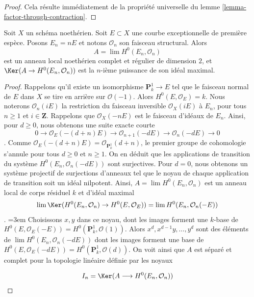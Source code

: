 \begin{proof} Cela résulte immédiatement de la propriété universelle du lemme \ref{lemma-factor-through-contraction}. \end{proof}

\begin{lemma} \label{lemma-exceptional-first-kind-local} Soit $X$ un schéma noethérien. Soit $E \subset X$ une courbe exceptionnelle de première espèce. Posons $E_n = nE$ et notons $\mathcal{O}_n$ son faisceau structural. Alors $$
A = \lim H^0(E_n, \mathcal{O}_n)
$$ est un anneau local noethérien complet et régulier de dimension $2$, et $\Ker(A \to H^0(E_n, \mathcal{O}_n))$ est la $n$-ième puissance de son idéal maximal. \end{lemma}

\begin{proof} Rappelons qu'il existe un isomorphisme $\mathbf{P}^1_k \to E$ tel que le faisceau normal de $E$ dans $X$ se tire en arrière sur $\mathcal{O}(-1)$. Alors $H^0(E, \mathcal{O}_E) = k$. Nous noterons $\mathcal{O}_n(iE)$ la restriction du faisceau inversible $\mathcal{O}_X(iE)$ à $E_n$, pour tous $n \geq 1$ et $i \in \mathbf{Z}$. Rappelons que $\mathcal{O}_X(-nE)$ est le faisceau d'idéaux de $E_n$. Ainsi, pour $d \geq 0$, nous obtenons une suite exacte courte $$
0 \to \mathcal{O}_E(-(d + n)E) \to
\mathcal{O}_{n + 1}(-dE) \to
\mathcal{O}_n(-dE) \to 0
$$. Comme $\mathcal{O}_E(-(d + n)E) = \mathcal{O}_{\mathbf{P}^1_k}(d + n)$, le premier groupe de cohomologie s'annule pour tous $d \geq 0$ et $n \geq 1$. On en déduit que les applications de transition du système $H^0(E_n, \mathcal{O}_n(-dE))$ sont surjectives. Pour $d = 0$, nous obtenons un système projectif de surjections d'anneaux tel que le noyau de chaque application de transition soit un idéal nilpotent. Ainsi, $A = \lim H^0(E_n, \mathcal{O}_n)$ est un anneau local de corps résiduel $k$ et d'idéal maximal $$
\lim \Ker(H^0(E_n, \mathcal{O}_n) \to H^0(E, \mathcal{O}_E)) =
\lim H^0(E_n, \mathcal{O}_n(-E))
$$.
\begingroup\emergencystretch=3em
Choisissons $x, y$ dans ce noyau, dont les images forment une $k$-base de $H^0(E, \mathcal{O}_E(-E)) = H^0(\mathbf{P}^1_k, \mathcal{O}(1))$. Alors $x^d, x^{d - 1}y, \ldots, y^d$ sont des éléments de $\lim H^0(E_n, \mathcal{O}_n(-dE))$ dont les images forment une base de $H^0(E, \mathcal{O}_E(-dE)) = H^0(\mathbf{P}^1_k, \mathcal{O}(d))$. On voit ainsi que $A$ est séparé et complet pour la topologie linéaire définie par les noyaux\par\endgroup
$$
I_n = \Ker(A \longrightarrow H^0(E_n, \mathcal{O}_n))
$$
\end{proof}
